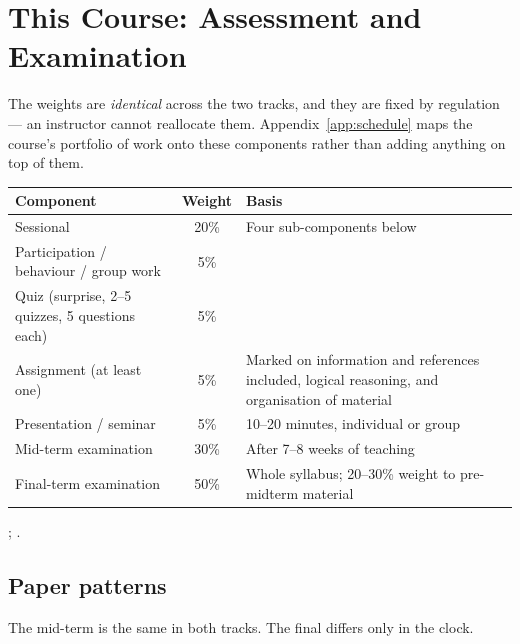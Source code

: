 \section{This Course: Assessment and Examination}

The weights are \emph{identical} across the two tracks, and they are fixed by
regulation --- an instructor cannot reallocate them. Appendix~\ref{app:schedule}
maps the course's portfolio of work onto these components rather than adding
anything on top of them.

\begin{center}
\small
\begin{tabular}{@{}L{5.4cm}cL{7.2cm}@{}}
\toprule
\textbf{Component} & \textbf{Weight} & \textbf{Basis} \\
\midrule
Sessional                       & 20\% & Four sub-components below \\
\quad Participation / behaviour / group work & 5\% & \\
\quad Quiz (surprise, 2--5 quizzes, 5 questions each) & 5\% & \\
\quad Assignment (at least one)  & 5\% & Marked on information and references
                                         included, logical reasoning, and
                                         organisation of material \\
\quad Presentation / seminar     & 5\% & 10--20 minutes, individual or group \\
Mid-term examination            & 30\% & After 7--8 weeks of teaching \\
Final-term examination          & 50\% & Whole syllabus; 20--30\% weight to
                                         pre-midterm material \\
\bottomrule
\end{tabular}
\end{center}

\noindent
{}; .

\subsection*{Paper patterns}

The mid-term is the same in both tracks. The final differs only in the clock.

